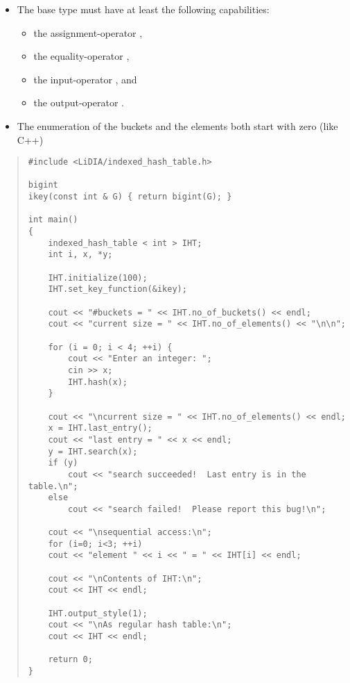 





\NOTES

\begin{itemize}
\item The base type  must have at least the following capabilities:
\begin{itemize}
\item the assignment-operator \code{=},
\item the equality-operator \code{==},
\item the input-operator \code{>>}, and
\item the output-operator \code{<<}.
\end{itemize}
\item The enumeration of the buckets and the elements both start with zero (like C++)
\end{itemize}



\EXAMPLES

\begin{quote}
\begin{verbatim}
#include <LiDIA/indexed_hash_table.h>

bigint
ikey(const int & G) { return bigint(G); }

int main()
{
    indexed_hash_table < int > IHT;
    int i, x, *y;

    IHT.initialize(100);
    IHT.set_key_function(&ikey);

    cout << "#buckets = " << IHT.no_of_buckets() << endl;
    cout << "current size = " << IHT.no_of_elements() << "\n\n";

    for (i = 0; i < 4; ++i) {
        cout << "Enter an integer: ";
        cin >> x;
        IHT.hash(x);
    }

    cout << "\ncurrent size = " << IHT.no_of_elements() << endl;
    x = IHT.last_entry();
    cout << "last entry = " << x << endl;
    y = IHT.search(x);
    if (y)
        cout << "search succeeded!  Last entry is in the table.\n";
    else
        cout << "search failed!  Please report this bug!\n";

    cout << "\nsequential access:\n";
    for (i=0; i<3; ++i)
    cout << "element " << i << " = " << IHT[i] << endl;

    cout << "\nContents of IHT:\n";
    cout << IHT << endl;

    IHT.output_style(1);
    cout << "\nAs regular hash table:\n";
    cout << IHT << endl;

    return 0;
}
\end{verbatim}
\end{quote}

